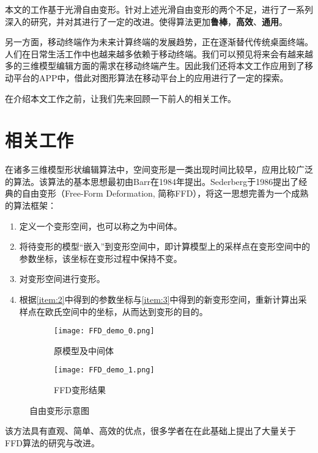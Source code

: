     本文的工作基于光滑自由变形\cite{Cui15}。针对上述光滑自由变形的两个不足，进行了一系列深入的研究，并对其进行了一定的改进。使得算法更加\textbf{鲁棒}，\textbf{高效}、\textbf{通用}。

    另一方面，移动终端作为未来计算终端的发展趋势，正在逐渐替代传统桌面终端。人们在日常生活工作中也越来越多依赖于移动终端。我们可以预见将来会有越来越多的三维模型编辑方面的需求在移动终端产生。因此我们还将本文工作应用到了移动平台的APP中，借此对图形算法在移动平台上的应用进行了一定的探索。

    在介绍本文工作之前，让我们先来回顾一下前人的相关工作。


\section{相关工作}
    在诸多三维模型形状编辑算法中，空间变形是一类出现时间比较早，应用比较广泛的算法。该算法的基本思想最初由Barr\cite{Barr84}在1984年提出。Sederberg\cite{Sederberg86}于1986提出了经典的自由变形（Free-Form Deformation, 简称FFD），将这一思想完善为一个成熟的算法框架：
\begin{enumerate}
	\item 定义一个变形空间，也可以称之为中间体。
    \item 将待变形的模型“嵌入”到变形空间中，即计算模型上的采样点在变形空间中的参数坐标，该坐标在变形过程中保持不变。\label{item:2}
	\item 对变形空间进行变形。\label{item:3}
    \item 根据\ref{item:2}中得到的参数坐标与\ref{item:3}中得到的新变形空间，重新计算出采样点在欧氏空间中的坐标，从而达到变形的目的。
\end{enumerate}

\begin{figure}[htbp]
	\centering
	\begin{subfigure}[b]{.4\textwidth}
		\centering
		\texttt{[image: FFD\_demo\_0.png]}
		\caption{原模型及中间体}\label{subfig:FFD_demo_0}
	\end{subfigure}
	\quad
	\begin{subfigure}[b]{.4\textwidth}
		\centering
		\texttt{[image: FFD\_demo\_1.png]}
		\caption{FFD变形结果}\label{subfig:FFD_demo_1}
	\end{subfigure}
    \caption{自由变形示意图}\label{fig:FFD_demo}
\end{figure}

    该方法具有直观、简单、高效的优点，很多学者在在此基础上提出了大量关于FFD算法的研究与改进。

